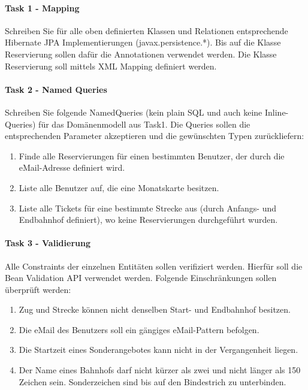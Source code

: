 \paragraph{Task 1 - Mapping}

Schreiben Sie f{\"u}r alle oben definierten Klassen und Relationen entsprechende Hibernate JPA Implementierungen (javax.persistence.*). Bis auf die Klasse Reservierung sollen daf{\"u}r die Annotationen verwendet werden. Die Klasse Reservierung soll mittels XML Mapping definiert werden.

\paragraph{Task 2 - Named Queries}

Schreiben Sie folgende NamedQueries (kein plain SQL und auch keine Inline-Queries) f{\"u}r das Dom{\"a}nenmodell aus Task1. Die Queries sollen die entsprechenden Parameter akzeptieren und die gew{\"u}nschten Typen zur{\"u}ckliefern:

\begin{enumerate}
    \item Finde alle Reservierungen f{\"u}r einen bestimmten Benutzer, der durch die eMail-Adresse definiert wird.
    \item Liste alle Benutzer auf, die eine Monatskarte besitzen.
    \item Liste alle Tickets f{\"u}r eine bestimmte Strecke aus (durch Anfangs- und Endbahnhof definiert), wo keine Reservierungen durchgef{\"u}hrt wurden.
\end{enumerate}

\paragraph{Task 3 - Validierung}

Alle Constraints der einzelnen Entit{\"a}ten sollen verifiziert werden. Hierf{\"u}r soll die Bean Validation API verwendet werden. Folgende Einschr{\"a}nkungen sollen {\"u}berpr{\"u}ft werden:

\begin{enumerate}
    \item Zug und Strecke k{\"o}nnen nicht denselben Start- und Endbahnhof besitzen.
    \item Die eMail des Benutzers soll ein g{\"a}ngiges eMail-Pattern befolgen.
    \item Die Startzeit eines Sonderangebotes kann nicht in der Vergangenheit liegen.
    \item Der Name eines Bahnhofs darf nicht k{\"u}rzer als zwei und nicht l{\"a}nger als 150 Zeichen sein. Sonderzeichen sind bis auf den Bindestrich zu unterbinden.
\end{enumerate}

